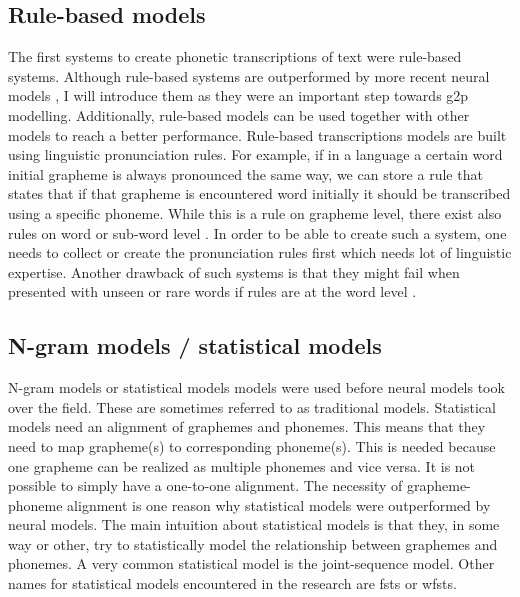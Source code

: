 \subsection{Rule-based models}
The first systems to create phonetic transcriptions of text were rule-based systems. Although rule-based systems are outperformed by more recent neural models \citep{Ashby-Bartley.2021, gorman-etal-2020-sigmorphon}, I will introduce them as they were an important step towards \ac{g2p} modelling. Additionally, rule-based models can be used together with other models to reach a better performance. Rule-based transcriptions models are built using linguistic pronunciation rules. For example, if in a language a certain word initial grapheme is always pronounced the same way, we can store a rule that states that if that grapheme is encountered word initially it should be transcribed using a specific phoneme. While this is a rule on grapheme level, there exist also rules on word or sub-word level \citep{mortensen-etal-2018-epitran}. In order to be able to create such a system, one needs to collect or create the pronunciation rules first which needs lot of linguistic expertise. Another drawback of such systems is that they might fail when presented with unseen or rare words if rules are at the word level \citep{ney-joint-sequence2008}.

\subsection{N-gram models / statistical models}
N-gram models or statistical models models were used before neural models took over the field. These are sometimes referred to as traditional models. Statistical models need an alignment of graphemes and phonemes. This means that they need to map grapheme(s) to corresponding phoneme(s). This is needed because one grapheme can be realized as multiple phonemes and vice versa. It is not possible to simply have a one-to-one alignment. The necessity of grapheme-phoneme alignment is one reason why statistical models were outperformed by neural models. The main intuition about statistical models is that they, in some way or other, try to statistically model the relationship between graphemes and phonemes. A very common statistical model is the joint-sequence model. Other names for statistical models encountered in the research are \acp{fst} or \acp{wfst}.

